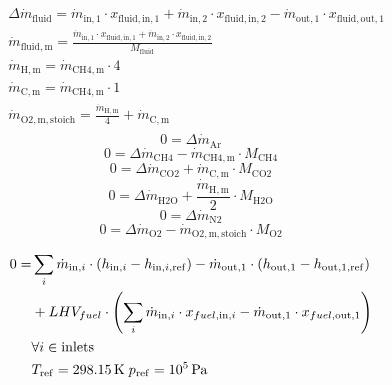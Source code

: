 \documentclass[]{article}
\begin{document}
\begin{equation}
\label{eq:CombustionChamber_stoichiometry_constraints_general_eq}
\begin{split}
&\Delta \dot{m}_\mathrm{fluid} = \dot{m}_\mathrm{in,1} \cdot x_\mathrm{fluid,in,1} +\dot{m}_\mathrm{in,2} \cdot x_\mathrm{fluid,in,2}-\dot{m}_\mathrm{out,1} \cdot x_\mathrm{fluid,out,1}\\
&\dot{m}_\mathrm{fluid,m} = \frac{\dot{m}_\mathrm{in,1} \cdot x_\mathrm{fluid,in,1} +\dot{m}_\mathrm{in,2} \cdot x_\mathrm{fluid,in,2}}{M_\mathrm{fluid}}\\
&\dot{m}_\mathrm{H,m}=\dot{m}_\mathrm{CH4,m} \cdot 4\\
&\dot{m}_\mathrm{C,m}=\dot{m}_\mathrm{CH4,m} \cdot 1\\
&\dot{m}_\mathrm{O2,m,stoich}=\frac{\dot{m}_\mathrm{H,m}}{4} + \dot{m}_\mathrm{C,m}\\
\end{split}
\end{equation}
\begin{equation}
\label{eq:CombustionChamber_stoichiometry_constraints_Ar}
0 = \Delta \dot{m}_\mathrm{Ar}
\end{equation}
\begin{equation}
\label{eq:CombustionChamber_stoichiometry_constraints_CH4}
0=\Delta\dot{m}_\mathrm{CH4}-\dot{m}_\mathrm{CH4,m} \cdot M_\mathrm{CH4}
\end{equation}
\begin{equation}
\label{eq:CombustionChamber_stoichiometry_constraints_CO2}
0=\Delta \dot{m}_\mathrm{CO2} + \dot{m}_\mathrm{C,m} \cdot M_\mathrm{CO2} 
\end{equation}
\begin{equation}
\label{eq:CombustionChamber_stoichiometry_constraints_H2O}
0=\Delta \dot{m}_\mathrm{H2O} + \frac{\dot{m}_\mathrm{H,m}}{2} \cdot M_\mathrm{H2O} 
\end{equation}
\begin{equation}
\label{eq:CombustionChamber_stoichiometry_constraints_N2}
0 = \Delta \dot{m}_\mathrm{N2}
\end{equation}
\begin{equation}
\label{eq:CombustionChamber_stoichiometry_constraints_O2}
0=\Delta\dot{m}_\mathrm{O2}-\dot{m}_\mathrm{O2,m,stoich} \cdot M_\mathrm{O2}
\end{equation}

\begin{equation}
\label{eq:CombustionChamber_energy_balance_constraints}
\begin{split}
0 = & \sum_i \dot{m}_{\mathrm{in,}i} \cdot\left( h_{\mathrm{in,}i} - h_{\mathrm{in,}i\mathrm{,ref}} \right) -\dot{m}_\mathrm{out,1}\cdot\left( h_\mathrm{out,1} - h_\mathrm{out,1,ref}\right)\\
& + LHV_{fuel} \cdot \left(\sum_i \dot{m}_{\mathrm{in,}i} \cdot x_{fuel\mathrm{,in,}i} - \dot{m}_\mathrm{out,1} \cdot x_{fuel\mathrm{,out,1}} \right)\\
& \forall i \in \text{inlets}\\& T_\mathrm{ref}=\unit[298.15]{K}\;p_\mathrm{ref}=\unit[10^5]{Pa}\\
\end{split}
\end{equation}
\end{document}
